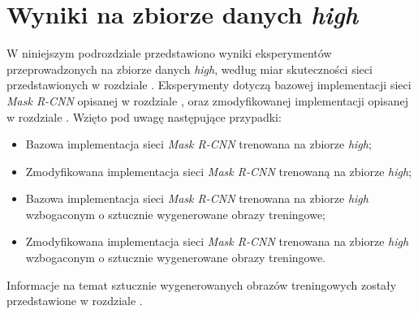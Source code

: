 \section{Wyniki na zbiorze danych \textit{high}}
W niniejszym podrozdziale przedstawiono wyniki eksperymentów przeprowadzonych na zbiorze danych \textit{high}, według miar skuteczności sieci przedstawionych w rozdziale .
Eksperymenty dotyczą bazowej implementacji sieci \textit{Mask R-CNN} \cite{matterport-mask-rcnn} opisanej w rozdziale , oraz zmodyfikowanej implementacji opisanej w rozdziale .
 Wzięto pod uwagę następujące przypadki:

\begin{itemize}
 \item Bazowa implementacja sieci \textit{Mask R-CNN} trenowana na zbiorze \textit{high};
 \item Zmodyfikowana implementacja sieci \textit{Mask R-CNN} trenowaną na zbiorze \textit{high};
 \item Bazowa implementacja sieci \textit{Mask R-CNN} trenowana na zbiorze \textit{high} wzbogaconym o sztucznie wygenerowane obrazy treningowe;
 \item Zmodyfikowana implementacja sieci \textit{Mask R-CNN} trenowana na zbiorze \textit{high} wzbogaconym o sztucznie wygenerowane obrazy treningowe.
\end{itemize}

Informacje na temat sztucznie wygenerowanych obrazów treningowych zostały przedstawione w rozdziale .

